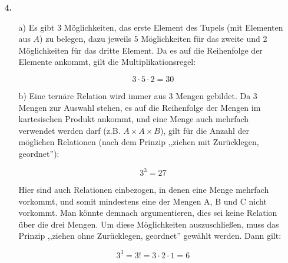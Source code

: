 \documentclass[a4paper,10pt]{scrartcl}
\begin{document}
\begin{enumerate}
    \item[\textbf{4.}]
        \begin{enumerate}
            \item[a)]
                Es gibt 3 Möglichkeiten, das erste Element des Tupels (mit Elementen aus $A$) zu belegen, dazu
                jeweils 5 Möglichkeiten für das zweite und 2 Möglichkeiten für das dritte Element. Da es auf die
                Reihenfolge der Elemente ankommt, gilt die Multiplikationsregel:

                $$3 \cdot 5 \cdot 2 = 30$$

            \item[b)]
                Eine ternäre Relation wird immer aus 3 Mengen gebildet. Da 3 Mengen zur Auswahl stehen, es auf
                die Reihenfolge der Mengen im kartesischen Produkt ankommt, und eine Menge auch mehrfach verwendet
                werden darf (z.B. $A \times A \times B$), gilt für die Anzahl der möglichen
                Relationen (nach dem Prinzip ,,ziehen mit Zurücklegen, geordnet''):

                $$3^3 = 27$$

                Hier sind auch Relationen einbezogen, in denen eine Menge mehrfach vorkommt, und somit mindestens eine
                der Mengen A, B und C nicht vorkommt. Man könnte demnach argumentieren, dies sei keine Relation über die
                drei Mengen. Um diese Möglichkeiten auszuschließen, muss das Prinzip
                ,,ziehen ohne Zurücklegen, geordnet'' gewählt werden. Dann gilt:

                $$3^{\underline{3}} = 3! = 3 \cdot 2 \cdot 1 = 6$$

        \end{enumerate}

\end{enumerate}
\end{document}
